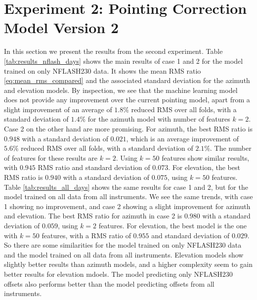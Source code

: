 \section{Experiment 2: Pointing Correction Model Version 2}
In this section we present the results from the second experiment.
Table \ref{tab:results_nflash_days} shows the main results of case 1 and 2 for the model trained on only NFLASH230 data.
It shows the mean RMS ratio \eqref{eq:mean_rms_compared} and the associated standard deviation for the azimuth and elevation models.
By inspection, we see that the machine learning model does not provide any improvement over the current pointing model,
apart from a slight improvement of an average of $1.8\%$ reduced RMS over all folds, with a standard deviation of $1.4\%$ for the azimuth model with number of features $k=2$.\\

Case 2 on the other hand are more promising. For azimuth, the best RMS ratio is $0.948$ with a standard deviation of $0.021$,
which is an average improvement of $5.6\%$ reduced RMS over all folds, with a standard deviation of $2.1\%$. 
The number of features for these results are $k=2$. Using $k=50$ features show similar results, with $0.945$ RMS ratio and standard deviation of $0.073$.
For elevation, the best RMS ratio is $0.940$ with a standard deviation of $0.075$, using $k=50$ features.\\

Table \ref{tab:results_all_days} shows the same results for case 1 and 2, but for the model trained on all data from all instruments.
We see the same trends, with case 1 showing no improvement, and case 2 showing a slight improvement for azimuth and elevation.
The best RMS ratio for azimuth in case 2 is $0.980$ with a standard deviation of $0.059$, using $k=2$ features.
For elevation, the best model is the one with $k=50$ features, with a RMS ratio of $0.955$ and standard deviation of $0.029$.\\

So there are some similarities for the model trained on only NFLASH230 data and the model trained on all data from all instruments.
Elevation models show slightly better results than azimuth models, and a higher complexity seem to gain better results for elevation mdoels.
The model predicting only NFLASH230 offsets also performs better than the model predicting offsets from all instruments.\\

